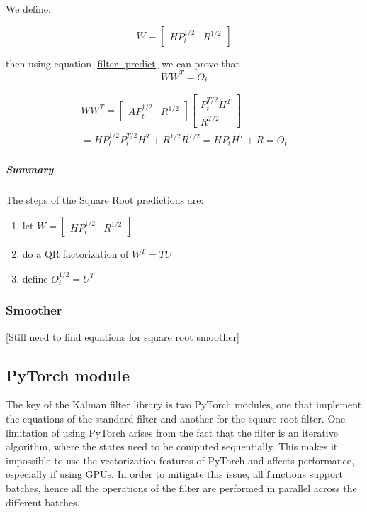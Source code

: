 \documentclass{article}
\let\Oldsubsection\subsection
\renewcommand{\subsection}{\FloatBarrier\Oldsubsection}
\let\Oldsubsubsection\subsubsection
\renewcommand{\subsubsection}{\FloatBarrier\Oldsubsubsection}
\begin{document}
We define:

\begin{equation}
    W = \begin{bmatrix}HP_{t}^{1/2} & R^{1/2}\end{bmatrix}
\end{equation}

then using equation \ref{filter_predict} we can prove that
\begin{equation}\label{predict_SR_mult}
WW^T = O_t 
\end{equation}

\begin{multline}
  WW^T =  \begin{bmatrix}AP_{t}^{1/2} & R^{1/2}\end{bmatrix}\begin{bmatrix}P_{t}^{T/2}H^T \\ R^{T/2}\end{bmatrix}\\
  = HP_{t}^{1/2}P_{t}^{T/2}H^T + R^{1/2}R^{T/2} = HP_{t}H^T + R = O_t
\end{multline}

\subparagraph{Summary} The steps of the Square Root predictions are:

\begin{enumerate}
    \item let  $W = \begin{bmatrix}HP_t^{1/2} & R^{1/2}\end{bmatrix}$
    \item do a QR factorization of $W^T=TU$
    \item define $O_t^{1/2} = U^T$
\end{enumerate}

\subsubsection{Smoother}

[Still need to find equations for square root smoother]

\subsection{PyTorch module}

The key of the Kalman filter library is two PyTorch modules, one that implement the equations of the standard filter and another for the square root filter.
One limitation of using PyTorch arises from the fact that the filter is an iterative algorithm, where the states need to be computed sequentially. This makes it impossible to use the vectorization features of PyTorch and affects performance, especially if using GPUs. In order to mitigate this issue, all functions support batches, hence all the operations of the filter are performed in parallel across the different batches.
\end{document}
